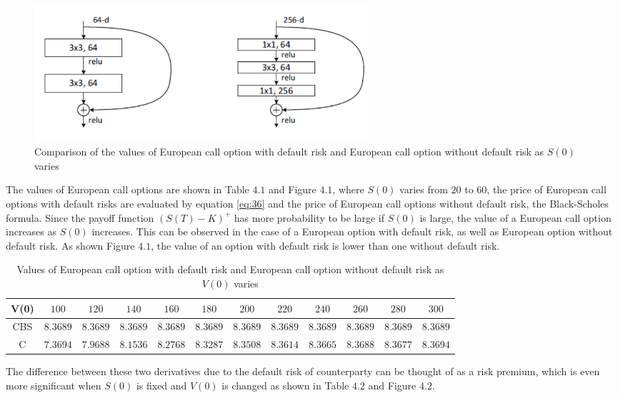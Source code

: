 \documentclass[pdf]{beamer}
\begin{document}
\begin{frame}[allowframebreaks]
\small
\begin{figure}[hp]
	\includegraphics[width=0.60\textwidth]{png/bottleneck.png}
	\caption{Comparison of the values of European call option with default risk and European call option without default risk as $S(0)$ varies}
	\label{fig:ife1}
\end{figure}
\small
The values of European call options are shown in Table $4.1$ and Figure $4.1$, where $S(0)$ varies from $20$ to $60$, the price of European call options with default risks are evaluated by equation \eqref{eq:36} and the price of European call options without default risk, the Black-Scholes formula. Since the payoff function $(S(T)- K)^{+}$ has more probability to be large if $S(0)$ is large, the value of a European call option increases as $S(0)$ increases. This can be observed in the case of a European option with default risk, as well as European option without default risk. As shown Figure $4.1$, the value of an option with default risk is lower than one without default risk.\\
\end{frame}
\begin{frame}[allowframebreaks]
\begin{table}
\small\addtolength{\tabcolsep}{-6pt}
\begin{tabular}{c|c|c|c|c|c|c|c|c|c|c|c}
V(0) & $100$ & $120$ & $140$ & $160$ & $180$ & $200$ & $220$ & $240$ & $260$  & $280$ & $300$\\
\hline 
CBS & $8.3689$ & $8.3689$ & $8.3689$ & $8.3689$ & $8.3689$ & $8.3689$ & $8.3689$ & $8.3689$ & $8.3689$ & $8.3689$ & $8.3689$\\
\hline
C & $7.3694$ & $7.9688$ & $8.1536$ & $8.2768$ & $8.3287$ & $8.3508$ & $8.3614$ & $8.3665$ & $8.3688$ & $8.3677$ & $8.3694$\\
\end{tabular}
\caption{Values of European call option with default risk and European call option without default risk as $V(0)$ varies}
\end{table}
\small
The difference between these two derivatives due to the default risk of counterparty can be thought of as a risk premium, which is even more significant when $S(0)$ is fixed and $V(0)$ is changed as shown in Table $4.2$ and Figure $4.2$.
\end{frame}
\end{document}
